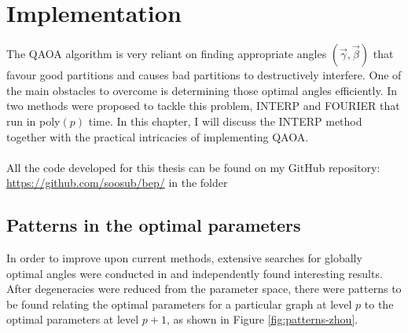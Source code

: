 \chapter{Implementation}
\label{chap:implementation}

The QAOA algorithm is very reliant on finding appropriate angles $(\vec{\gamma},\vec{\beta})$ that favour good partitions and causes bad partitions to destructively interfere. One of the main obstacles to overcome is determining those optimal angles efficiently. In \cite{ZWCPL18} two methods were proposed to tackle this problem, INTERP and FOURIER that run in poly$(p)$ time. In this chapter, I will discuss the INTERP method together with the practical intricacies of implementing QAOA.
\\~\\
All the code developed for this thesis can be found on my GitHub repository: $\ $    \url{https://github.com/soosub/bep/} in the folder 

\section{Patterns in the optimal parameters}

In order to improve upon current methods, extensive searches for globally optimal angles were conducted in \cite{ZWCPL18, Crooks18}  and independently found interesting results. After degeneracies were reduced from the parameter space, there were patterns to be found relating the optimal parameters for a particular graph at level $p$ to the optimal parameters at level $p+1$, as shown in Figure \ref{fig:patterns-zhou}.

